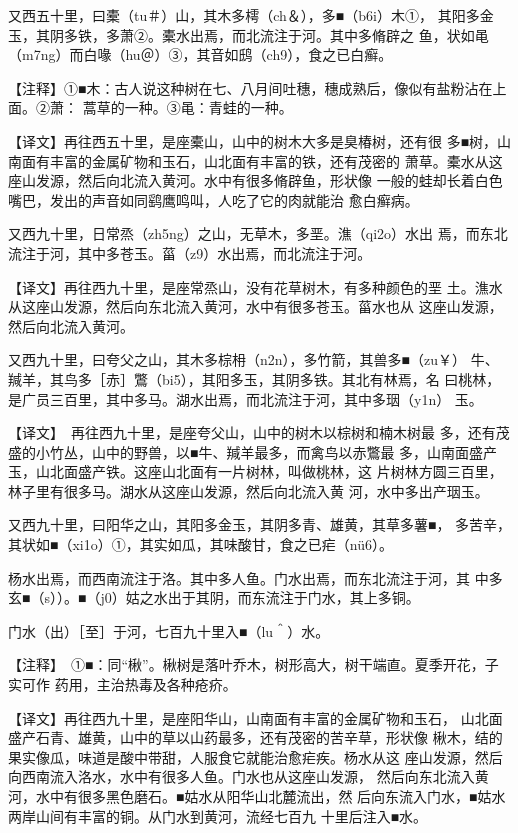 \documentclass[a4paper,12pt,UTF8,twoside]{ctexbook}
\begin{document}
又西五十里，曰橐（tu＃）山，其木多樗（ch＆），多■（b6i）木①， 其阳多金玉，其阴多铁，多萧②。橐水出焉，而北流注于河。其中多脩辟之 鱼，状如黾（m7ng）而白喙（hu＠）③，其音如鸱（ch9），食之已白癣。

【注释】①■木：古人说这种树在七、八月间吐穗，穗成熟后，像似有盐粉沾在上面。②萧： 蒿草的一种。③黾：青蛙的一种。

【译文】再往西五十里，是座橐山，山中的树木大多是臭椿树，还有很 多■树，山南面有丰富的金属矿物和玉石，山北面有丰富的铁，还有茂密的 萧草。橐水从这座山发源，然后向北流入黄河。水中有很多脩辟鱼，形状像 一般的蛙却长着白色嘴巴，发出的声音如同鹞鹰鸣叫，人吃了它的肉就能治 愈白癣病。

又西九十里，日常烝（zh5ng）之山，无草木，多垩。潐（qi2o）水出 焉，而东北流注于河，其中多苍玉。菑（z9）水出焉，而北流注于河。

【译文】再往西九十里，是座常烝山，没有花草树木，有多种颜色的垩 土。潐水从这座山发源，然后向东北流入黄河，水中有很多苍玉。菑水也从 这座山发源，然后向北流入黄河。

又西九十里，曰夸父之山，其木多棕枏（n2n），多竹箭，其兽多■（zu￥） 牛、羬羊，其鸟多［赤］鷩（bi5），其阳多玉，其阴多铁。其北有林焉，名 曰桃林，是广员三百里，其中多马。湖水出焉，而北流注于河，其中多珚（y1n） 玉。

【译文】　再往西九十里，是座夸父山，山中的树木以棕树和楠木树最 多，还有茂盛的小竹丛，山中的野兽，以■牛、羬羊最多，而禽鸟以赤鷩最 多，山南面盛产玉，山北面盛产铁。这座山北面有一片树林，叫做桃林，这 片树林方圆三百里，林子里有很多马。湖水从这座山发源，然后向北流入黄 河，水中多出产珚玉。

又西九十里，曰阳华之山，其阳多金玉，其阴多青、雄黄，其草多薯■， 多苦辛，其状如■（xi1o）①，其实如瓜，其味酸甘，食之已疟（nü6）。

杨水出焉，而西南流注于洛。其中多人鱼。门水出焉，而东北流注于河，其 中多玄■（s））。■（j0）姑之水出于其阴，而东流注于门水，其上多铜。

门水（出）［至］于河，七百九十里入■（lu＾）水。

【注释】　①■：同“楸”。楸树是落叶乔木，树形高大，树干端直。夏季开花，子实可作 药用，主治热毒及各种疮疥。

【译文】再往西九十里，是座阳华山，山南面有丰富的金属矿物和玉石， 山北面盛产石青、雄黄，山中的草以山药最多，还有茂密的苦辛草，形状像 楸木，结的果实像瓜，味道是酸中带甜，人服食它就能治愈疟疾。杨水从这 座山发源，然后向西南流入洛水，水中有很多人鱼。门水也从这座山发源， 然后向东北流入黄河，水中有很多黑色磨石。■姑水从阳华山北麓流出，然 后向东流入门水，■姑水两岸山间有丰富的铜。从门水到黄河，流经七百九 十里后注入■水。
\end{document}
